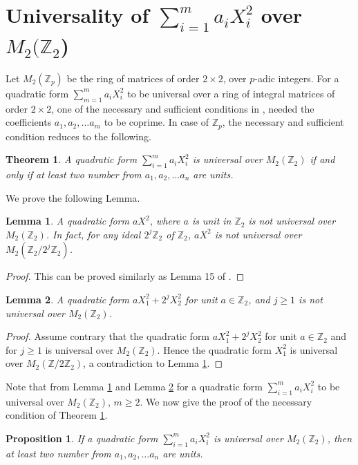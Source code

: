 \documentclass[12pt,a4paper]{article}
\newtheorem{thm}{Theorem}[section]
\newtheorem{lem}{Lemma}[section]
\newtheorem{prop}{Proposition}[section]
\begin{document}
	\section{Universality of $\sum_{i=1}^{m}a_iX_i^2$ over $M_2(\mathbb{Z}_2$)} \label{Sec M2Zp Main theorems}
	Let $M_2(\mathbb{Z}_p)$ be the ring of matrices of order $2 \times 2$, over $p$-adic integers. For a quadratic form $\sum_{m=1}^{m}a_iX_i^2$ to be universal over a ring of integral matrices of order $2 \times 2$, one of the necessary and sufficient conditions in \cite{JunginLee}, needed the coefficients $a_1, a_2, \ldots a_m$ to be coprime. In case of $\mathbb{Z}_p$, the necessary and sufficient condition reduces to the following.
	\begin{thm}\label{thm Main theorem p=2}
		A quadratic form $\sum_{i=1}^{m} a_iX_i^2$ is universal over $M_2(\mathbb{Z}_2)$ if and only if at least two number from $a_1,a_2, \ldots a_n$ are units.
	\end{thm}
	We prove the following Lemma.
	\begin{lem} \label{aX2 over Z2}
		A quadratic form $aX^2$, where $a$ is unit in $ \mathbb{Z}_2 $ is not universal over $M_2(\mathbb{Z}_2)$. In fact, for any ideal $2^j\mathbb{Z}_2$ of $\mathbb{Z}_2$, $aX^2$ is not universal over $M_2(\mathbb{Z}_2/2^j\mathbb{Z}_2)$.
	\end{lem}
	\begin{proof}
		This can be proved similarly as Lemma 15 of \cite{Nullwala2022}.
	\end{proof}
	\begin{lem}\label{a1x1^2 + a_2^jX_2^2 over Z2}
		A quadratic form $aX_1^2 + 2^jX_2^2 $ for unit $a \in \mathbb{Z}_2$, and $j \geq 1$ is not universal over $M_2(\mathbb{Z}_2)$.
	\end{lem}
	\begin{proof}
		Assume contrary that the quadratic form $aX_1^2 + 2^jX_2^2 $ for unit $a \in \mathbb{Z}_2$ and for $j \geq 1$ is universal over $M_2(\mathbb{Z}_2)$. Hence the quadratic form $X_1^2$ is universal over $M_2(\mathbb{Z}/2\mathbb{Z}_2)$, a contradiction to Lemma \ref{aX2 over Z2}.
	\end{proof}
	Note that from Lemma \ref{aX2 over Z2} and Lemma \ref{a1x1^2 + a_2^jX_2^2 over Z2} for a quadratic form $\sum_{i=1}^{m} a_iX_i^2$ to be universal over $M_2(\mathbb{Z}_2)$, $m \geq 2$.
	We now give the proof of the necessary condition of Theorem \ref{thm Main theorem p=2}.
	\begin{prop}\label{necce condition main thm p=2}
		If a quadratic form $\sum_{i=1}^{m} a_iX_i^2$ is universal over $M_2(\mathbb{Z}_2)$, then at least two number from $a_1,a_2, \ldots a_n$ are units.
	\end{prop}
\end{document}

